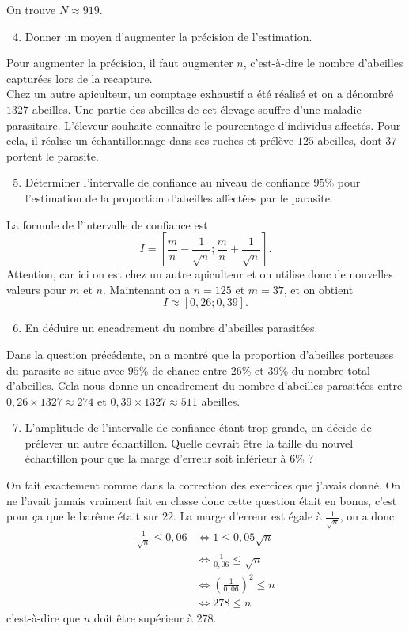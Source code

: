 \documentclass[11pt]{article}
\begin{document}
On trouve $N\approx919$.
\begin{enumerate}
    \setcounter{enumi}{3}
  \item Donner un moyen d'augmenter la précision de l'estimation.
\end{enumerate}
Pour augmenter la précision, il faut augmenter $n$, c'est-à-dire le nombre
d'abeilles capturées lors de la recapture.\\[5mm]
\noindent Chez un autre apiculteur, un comptage exhaustif a été réalisé et on a dénombré
$1327$ abeilles. Une partie des abeilles de cet élevage souffre d'une maladie
parasitaire. L'éleveur souhaite connaître le pourcentage d'individus affectés.
Pour cela, il réalise un échantillonnage dans ses ruches et prélève $125$
abeilles, dont $37$ portent le parasite.
\begin{enumerate}
    \setcounter{enumi}{4}
  \item Déterminer l'intervalle de confiance au niveau de confiance $95$\% pour
    l'estimation de la proportion d'abeilles affectées par le parasite.
\end{enumerate}
La formule de l'intervalle de confiance est
\[
  I=\left[ \frac{m}{n}-\frac{1}{\sqrt n};\frac{m}{n}+\frac{1}{\sqrt n} \right].
\]
Attention, car ici on est chez un autre apiculteur et on utilise donc de
nouvelles valeurs pour $m$ et $n$. Maintenant on a $n=125$ et $m=37$, et on
obtient
\[
  I\approx\left[ 0,26; 0,39 \right].
\]
\begin{enumerate}
    \setcounter{enumi}{5}
  \item En déduire un encadrement du nombre d'abeilles parasitées.
\end{enumerate}
Dans la question précédente, on a montré que la proportion d'abeilles porteuses
du parasite se situe avec $95$\% de chance entre $26$\% et $39$\% du nombre
total d'abeilles. Cela nous donne un encadrement du nombre d'abeilles
parasitées entre $0,26\times1327\approx274$ et $0,39\times1327\approx511$
abeilles.
\begin{enumerate}
    \setcounter{enumi}{6}
  \item L'amplitude de l'intervalle de confiance étant trop grande, on décide de prélever un
    autre échantillon. Quelle devrait être la taille du nouvel échantillon pour
    que la marge d'erreur soit inférieur à $6$\% ?
\end{enumerate}
On fait exactement comme dans la correction des exercices que j'avais donné. On
ne l'avait jamais vraiment fait en classe donc cette question était en bonus,
c'est pour ça que le barême était sur $22$. La marge d'erreur est égale à
$\frac{1}{\sqrt n}$, on a donc
\begin{align*}
  \frac{1}{\sqrt n} \leq 0,06 &\Longleftrightarrow 1\leq0,05\sqrt n \\
  &\Longleftrightarrow\frac{1}{0,06}\leq\sqrt n \\
  &\Longleftrightarrow\left( \frac{1}{0,06} \right)^2\leq n \\
  &\Longleftrightarrow278\leq n
\end{align*}
c'est-à-dire que $n$ doit être supérieur à $278$.
\end{document}
